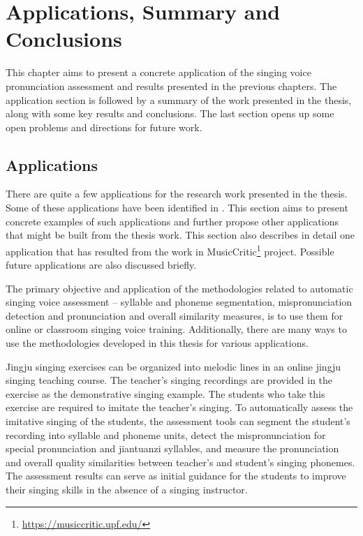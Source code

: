 \chapter{Applications, Summary and Conclusions}\label{chap:conclusions}

This chapter aims to present a concrete application of the singing voice pronunciation assessment and results presented in the previous chapters. The application section is followed by a summary of the work presented in the thesis, along with some key results and conclusions. The last section opens up some open problems and directions for future work. 

\section{Applications}

There are quite a few applications for the research work presented in the thesis. Some of these applications have been identified in . This section aims to present concrete examples of such applications and further propose other applications that might be built from the thesis work. This section also describes in detail one application that has resulted from the work in MusicCritic\footnote{\url{https://musiccritic.upf.edu/}} project. Possible future applications are also discussed briefly.

The primary objective and application of the methodologies related to automatic singing voice assessment -- syllable and phoneme segmentation, mispronunciation detection and pronunciation and overall similarity measures, is to use them for online or classroom singing voice training. Additionally, there are many ways to use the methodologies developed in this thesis for various applications.

Jingju singing exercises can be organized into melodic lines in an online jingju singing teaching course. The teacher's singing recordings are provided in the exercise as the demonstrative singing example. The students who take this exercise are required to imitate the teacher's singing. To automatically assess the imitative singing of the students, the assessment tools can segment the student's recording into syllable and phoneme units, detect the mispronunciation for special pronunciation and jiantuanzi syllables, and measure the pronunciation and overall quality similarities between teacher's and student's singing phonemes. The assessment results can serve as initial guidance for the students to improve their singing skills in the absence of a singing instructor.

